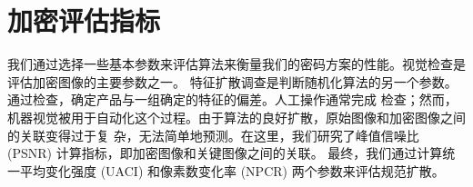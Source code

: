 \section{加密评估指标}

我们通过选择一些基本参数来评估算法来衡量我们的密码方案的性能。视觉检查是评估加密图像的主要参数之一。
特征扩散调查是判断随机化算法的另一个参数。通过检查，确定产品与一组确定的特征的偏差。人工操作通常完成
检查；然而，机器视觉被用于自动化这个过程。由于算法的良好扩散，原始图像和加密图像之间的关联变得过于复
杂，无法简单地预测。在这里，我们研究了峰值信噪比 (PSNR) 计算指标，即加密图像和关键图像之间的关联。
最终，我们通过计算统一平均变化强度 (UACI) 和像素数变化率 (NPCR) 两个参数来评估规范扩散。\citep{ul2020algebra}